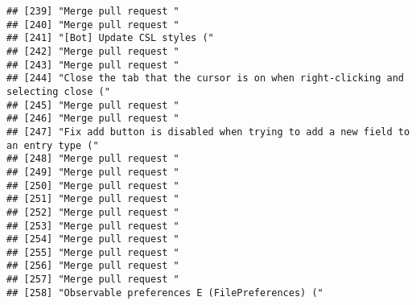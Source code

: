 \documentclass[
]{article}
\begin{document}
\begin{verbatim}
## [239] "Merge pull request "                                                                                                        
## [240] "Merge pull request "                                                                                                        
## [241] "[Bot] Update CSL styles ("                                                                                                  
## [242] "Merge pull request "                                                                                                        
## [243] "Merge pull request "                                                                                                        
## [244] "Close the tab that the cursor is on when right-clicking and selecting close ("                                              
## [245] "Merge pull request "                                                                                                        
## [246] "Merge pull request "                                                                                                        
## [247] "Fix add button is disabled when trying to add a new field to an entry type ("                                               
## [248] "Merge pull request "                                                                                                        
## [249] "Merge pull request "                                                                                                        
## [250] "Merge pull request "                                                                                                        
## [251] "Merge pull request "                                                                                                        
## [252] "Merge pull request "                                                                                                        
## [253] "Merge pull request "                                                                                                        
## [254] "Merge pull request "                                                                                                        
## [255] "Merge pull request "                                                                                                        
## [256] "Merge pull request "                                                                                                        
## [257] "Merge pull request "                                                                                                        
## [258] "Observable preferences E (FilePreferences) ("                                                                               

\end{verbatim}
\end{document}
